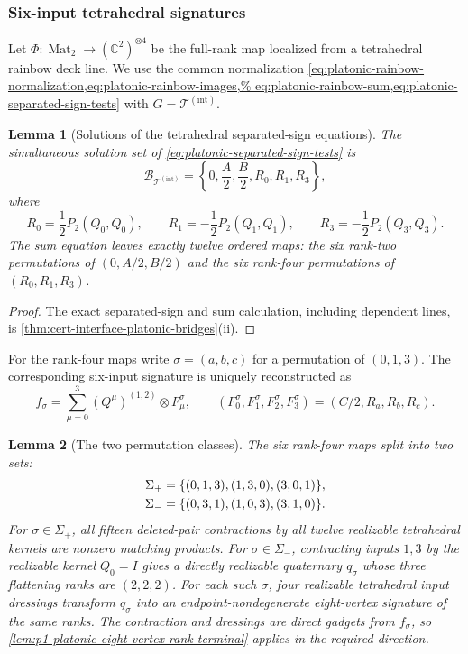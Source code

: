 \documentclass[11pt,letterpaper,onecolumn]{article}
\theoremstyle{plain}
\newtheorem{lemma}[lemma]{Lemma}
\theoremstyle{definition}
\theoremstyle{remark}
\newcommand{\TetInt}{{\mathcal T^{(\mathrm{int})}}}
\newcommand{\Mat}{\operatorname{Mat}}
\begin{document}
\subsubsection{Six-input tetrahedral signatures}

Let \(\Phi:\Mat_2\to{(\mathbb C^2)}^{\otimes4}\) be the full-rank map
localized from a tetrahedral rainbow deck line.  We use the common normalization
\cref{eq:platonic-rainbow-normalization,eq:platonic-rainbow-images,%
eq:platonic-rainbow-sum,eq:platonic-separated-sign-tests} with
\(G=\TetInt\).

\begin{lemma}[Solutions of the tetrahedral separated-sign equations]
\label{lem:tetrahedral-bridge}
The simultaneous solution set of
\cref{eq:platonic-separated-sign-tests} is
\begin{equation*}
  \mathcal B_{\TetInt}
  =\left\{0,\frac A2,\frac B2,R_0,R_1,R_3\right\},
\end{equation*}
where
\begin{equation*}
  R_0=\frac12P_2(Q_0,Q_0),\qquad
  R_1=-\frac12P_2(Q_1,Q_1),\qquad
  R_3=-\frac12P_2(Q_3,Q_3).
\end{equation*}
The sum equation leaves exactly twelve ordered maps: the six rank-two
permutations of \((0,A/2,B/2)\) and the six rank-four permutations of
\((R_0,R_1,R_3)\).
\end{lemma}

\begin{proof}
The exact separated-sign and sum calculation, including dependent lines,
is \cref{thm:cert-interface-platonic-bridges}\textnormal{(ii)}.
\end{proof}

For the rank-four maps write \(\sigma=(a,b,c)\) for a permutation of
\((0,1,3)\).  The corresponding six-input signature is uniquely reconstructed
as
\begin{equation*}
  f_\sigma=
  \sum_{\mu=0}^3(Q^\mu)^{(1,2)}\otimes F^\sigma_\mu,\qquad
  (F^\sigma_0,F^\sigma_1,F^\sigma_2,F^\sigma_3)
  =(C/2,R_a,R_b,R_c).
\end{equation*}

\begin{lemma}[The two permutation classes]
\label{lem:tetrahedral-orientation}
The six rank-four maps split into two sets:
\begin{align*}
  \Sigma_+&=\{(0,1,3),(1,3,0),(3,0,1)\},\notag\\
  \Sigma_-&=\{(0,3,1),(1,0,3),(3,1,0)\}.
\end{align*}
For \(\sigma\in\Sigma_+\), all fifteen deleted-pair contractions by all
twelve realizable tetrahedral kernels are nonzero matching products.  For
\(\sigma\in\Sigma_-\), contracting inputs \(1,3\) by the realizable kernel
\(Q_0=I\) gives a directly realizable quaternary \(q_\sigma\) whose three
flattening ranks are \((2,2,2)\).  For each such \(\sigma\), four
realizable tetrahedral input dressings transform \(q_\sigma\) into an
endpoint-nondegenerate eight-vertex signature of the same ranks.  The
contraction and dressings are direct gadgets from \(f_\sigma\), so
\cref{lem:p1-platonic-eight-vertex-rank-terminal} applies in the required
direction.
\end{lemma}
\end{document}
